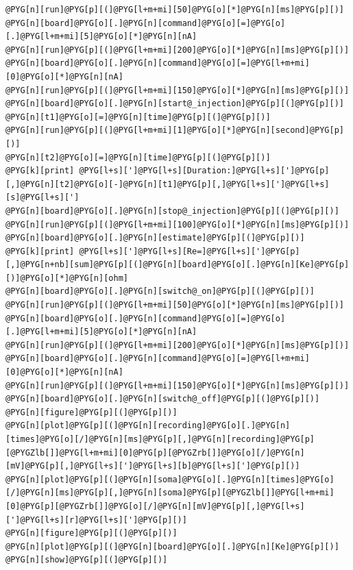 \documentclass[letterpaper,10pt,english]{manual}
\begin{document}
\begin{Verbatim}[commandchars=@\[\]]
@PYG[n][run]@PYG[p][(]@PYG[l+m+mi][50]@PYG[o][*]@PYG[n][ms]@PYG[p][)]
@PYG[n][board]@PYG[o][.]@PYG[n][command]@PYG[o][=]@PYG[o][.]@PYG[l+m+mi][5]@PYG[o][*]@PYG[n][nA]
@PYG[n][run]@PYG[p][(]@PYG[l+m+mi][200]@PYG[o][*]@PYG[n][ms]@PYG[p][)]
@PYG[n][board]@PYG[o][.]@PYG[n][command]@PYG[o][=]@PYG[l+m+mi][0]@PYG[o][*]@PYG[n][nA]
@PYG[n][run]@PYG[p][(]@PYG[l+m+mi][150]@PYG[o][*]@PYG[n][ms]@PYG[p][)]
@PYG[n][board]@PYG[o][.]@PYG[n][start@_injection]@PYG[p][(]@PYG[p][)]
@PYG[n][t1]@PYG[o][=]@PYG[n][time]@PYG[p][(]@PYG[p][)]
@PYG[n][run]@PYG[p][(]@PYG[l+m+mi][1]@PYG[o][*]@PYG[n][second]@PYG[p][)]
@PYG[n][t2]@PYG[o][=]@PYG[n][time]@PYG[p][(]@PYG[p][)]
@PYG[k][print] @PYG[l+s][']@PYG[l+s][Duration:]@PYG[l+s][']@PYG[p][,]@PYG[n][t2]@PYG[o][-]@PYG[n][t1]@PYG[p][,]@PYG[l+s][']@PYG[l+s][s]@PYG[l+s][']
@PYG[n][board]@PYG[o][.]@PYG[n][stop@_injection]@PYG[p][(]@PYG[p][)]
@PYG[n][run]@PYG[p][(]@PYG[l+m+mi][100]@PYG[o][*]@PYG[n][ms]@PYG[p][)]
@PYG[n][board]@PYG[o][.]@PYG[n][estimate]@PYG[p][(]@PYG[p][)]
@PYG[k][print] @PYG[l+s][']@PYG[l+s][Re=]@PYG[l+s][']@PYG[p][,]@PYG[n+nb][sum]@PYG[p][(]@PYG[n][board]@PYG[o][.]@PYG[n][Ke]@PYG[p][)]@PYG[o][*]@PYG[n][ohm]
@PYG[n][board]@PYG[o][.]@PYG[n][switch@_on]@PYG[p][(]@PYG[p][)]
@PYG[n][run]@PYG[p][(]@PYG[l+m+mi][50]@PYG[o][*]@PYG[n][ms]@PYG[p][)]
@PYG[n][board]@PYG[o][.]@PYG[n][command]@PYG[o][=]@PYG[o][.]@PYG[l+m+mi][5]@PYG[o][*]@PYG[n][nA]
@PYG[n][run]@PYG[p][(]@PYG[l+m+mi][200]@PYG[o][*]@PYG[n][ms]@PYG[p][)]
@PYG[n][board]@PYG[o][.]@PYG[n][command]@PYG[o][=]@PYG[l+m+mi][0]@PYG[o][*]@PYG[n][nA]
@PYG[n][run]@PYG[p][(]@PYG[l+m+mi][150]@PYG[o][*]@PYG[n][ms]@PYG[p][)]
@PYG[n][board]@PYG[o][.]@PYG[n][switch@_off]@PYG[p][(]@PYG[p][)]
@PYG[n][figure]@PYG[p][(]@PYG[p][)]
@PYG[n][plot]@PYG[p][(]@PYG[n][recording]@PYG[o][.]@PYG[n][times]@PYG[o][/]@PYG[n][ms]@PYG[p][,]@PYG[n][recording]@PYG[p][@PYGZlb[]]@PYG[l+m+mi][0]@PYG[p][@PYGZrb[]]@PYG[o][/]@PYG[n][mV]@PYG[p][,]@PYG[l+s][']@PYG[l+s][b]@PYG[l+s][']@PYG[p][)]
@PYG[n][plot]@PYG[p][(]@PYG[n][soma]@PYG[o][.]@PYG[n][times]@PYG[o][/]@PYG[n][ms]@PYG[p][,]@PYG[n][soma]@PYG[p][@PYGZlb[]]@PYG[l+m+mi][0]@PYG[p][@PYGZrb[]]@PYG[o][/]@PYG[n][mV]@PYG[p][,]@PYG[l+s][']@PYG[l+s][r]@PYG[l+s][']@PYG[p][)]
@PYG[n][figure]@PYG[p][(]@PYG[p][)]
@PYG[n][plot]@PYG[p][(]@PYG[n][board]@PYG[o][.]@PYG[n][Ke]@PYG[p][)]
@PYG[n][show]@PYG[p][(]@PYG[p][)]
\end{Verbatim}

\resetcurrentobjects
\hypertarget{--doc-examples-electrophysiology_bridge}{}
\end{document}
